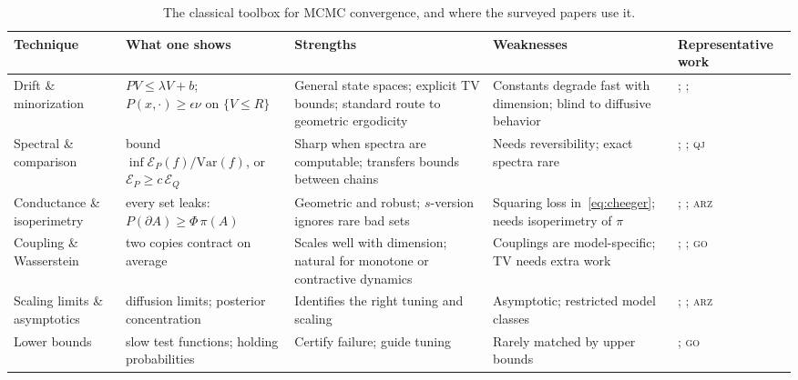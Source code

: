 \documentclass[11pt]{article}
\theoremstyle{remark}
\newcommand{\QJ}{\textsc{qj}}
\newcommand{\ARZ}{\textsc{arz}}
\newcommand{\GO}{\textsc{go}}
\begin{document}
\begin{table}[t]
\centering\footnotesize
\renewcommand{\arraystretch}{1.18}
\begin{tabularx}{\textwidth}{@{}L{2.15cm}YYYL{2.75cm}@{}}
\toprule
\textbf{Technique} & \textbf{What one shows} & \textbf{Strengths} & \textbf{Weaknesses} & \textbf{Representative work} \\
\midrule
Drift \& minorization & $PV\le\lambda V+b$; \ $P(x,\cdot)\ge\epsilon\nu$ on $\{V\le R\}$ & General state spaces; explicit TV bounds; standard route to geometric ergodicity & Constants degrade fast with dimension; blind to diffusive behavior & \citet{rosenthal1995}; \citet{meyn2009}; \citet{qin2021limitations} \\
Spectral \& comparison & bound $\inf\mathcal E_P(f)/\mathrm{Var}(f)$, or $\mathcal E_P\ge c\,\mathcal E_Q$ & Sharp when spectra are computable; transfers bounds between chains & Needs reversibility; exact spectra rare & \citet{diaconis1993comparison}; \citet{liu1994covariance}; \QJ \\
Conductance \& isoperimetry & every set leaks: $P(\partial A)\ge\Phi\,\pi(A)$ & Geometric and robust; $s$-version ignores rare bad sets & Squaring loss in~\eqref{eq:cheeger}; needs isoperimetry of $\pi$ & \citet{sinclair1989}; \citet{lovasz1993random}; \ARZ \\
Coupling \& Wasserstein & two copies contract on average & Scales well with dimension; natural for monotone or contractive dynamics & Couplings are model-specific; TV needs extra work & \citet{bubley1997path}; \citet{qin2022wasserstein}; \GO \\
Scaling limits \& asymptotics & diffusion limits; posterior concentration & Identifies the right tuning and scaling & Asymptotic; restricted model classes & \citet{roberts1997weak}; \citet{belloni2009}; \ARZ \\
Lower bounds & slow test functions; holding probabilities & Certify failure; guide tuning & Rarely matched by upper bounds & \citet{brown2024lower}; \GO \\
\bottomrule
\end{tabularx}
\caption{The classical toolbox for MCMC convergence, and where the surveyed papers use it.}
\label{tab:toolbox}
\end{table}
\end{document}
